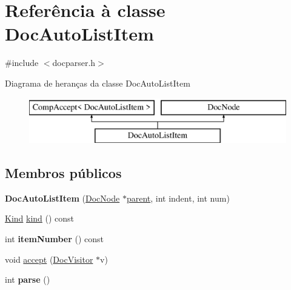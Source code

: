 \hypertarget{class_doc_auto_list_item}{\section{Referência à classe Doc\-Auto\-List\-Item}
\label{class_doc_auto_list_item}
}


{\ttfamily \#include $<$docparser.\-h$>$}

Diagrama de heranças da classe Doc\-Auto\-List\-Item\begin{figure}[H]
\begin{center}
\leavevmode
\includegraphics[height=2.000000cm]{class_doc_auto_list_item}
\end{center}
\end{figure}
\subsection*{Membros públicos}
\begin{DoxyCompactItemize}
\item 
\hypertarget{class_doc_auto_list_item_a74791bba93fd11247263b9cefe97aa44}{{\bfseries Doc\-Auto\-List\-Item} (\hyperlink{class_doc_node}{Doc\-Node} $\ast$\hyperlink{class_doc_node_abd7f070d6b0a38b4da71c2806578d19d}{parent}, int indent, int num)}\label{class_doc_auto_list_item_a74791bba93fd11247263b9cefe97aa44}

\item 
\hyperlink{class_doc_node_aa10c9e8951b8ccf714a59ec321bdac5b}{Kind} \hyperlink{class_doc_auto_list_item_aa9d037bed9f9a083d0cd01485637d843}{kind} () const 
\item 
\hypertarget{class_doc_auto_list_item_aab230540db83077dc3c2bf369d007c1e}{int {\bfseries item\-Number} () const }\label{class_doc_auto_list_item_aab230540db83077dc3c2bf369d007c1e}

\item 
void \hyperlink{class_doc_auto_list_item_a7ba716e854ae2f8f87a4eb2140e302b6}{accept} (\hyperlink{class_doc_visitor}{Doc\-Visitor} $\ast$v)
\item 
\hypertarget{class_doc_auto_list_item_a67007fc2be130666fbf3b065022756f4}{int {\bfseries parse} ()}\label{class_doc_auto_list_item_a67007fc2be130666fbf3b065022756f4}

\end{DoxyCompactItemize}

